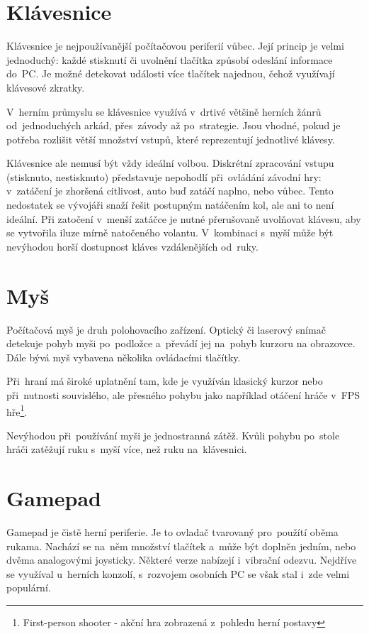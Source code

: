 \documentclass[thesis=B,czech,hidelinks]{FITthesis}[2012/06/26] %
\begin{document}
\section{Klávesnice}

Klávesnice je nejpoužívanější počítačovou periferií vůbec. Její princip je velmi jednoduchý: každé stisknutí či uvolnění tlačítka způsobí odeslání informace do~PC. Je možné detekovat události více tlačítek najednou, čehož využívají klávesové zkratky.

V~herním průmyslu se klávesnice využívá v~drtivé většině herních žánrů od~jednoduchých arkád, přes~závody až po~strategie. Jsou vhodné, pokud je potřeba rozlišit větší množství vstupů, které reprezentují jednotlivé klávesy.

Klávesnice ale nemusí být vždy ideální volbou. Diskrétní zpracování vstupu (stisknuto, nestisknuto) představuje nepohodlí při~ovládání závodní hry: v~zatáčení je zhoršená citlivost, auto buď zatáčí naplno, nebo vůbec. Tento nedostatek se vývojáři snaží řešit postupným natáčením kol, ale ani to není ideální. Při zatočení v~menší zatáčce je nutné přerušovaně uvolňovat klávesu, aby se vytvořila iluze mírně natočeného volantu. V~kombinaci s~myší může být nevýhodou horší dostupnost kláves vzdálenějších od~ruky.

\section{Myš}

Počítačová myš je druh polohovacího zařízení. Optický či laserový snímač detekuje pohyb myši po~podložce a~převádí jej na~pohyb kurzoru na obrazovce. Dále bývá myš vybavena několika ovládacími tlačítky.

Při~hraní má široké uplatnění tam, kde je využíván klasický kurzor nebo při~nutnosti souvislého, ale přesného pohybu jako například otáčení hráče v~FPS hře\footnote{First-person shooter - akční hra zobrazená z~pohledu herní postavy}.

Nevýhodou při~používání myši je jednostranná zátěž. Kvůli pohybu po~stole hráči zatěžují ruku s~myší více, než ruku na~klávesnici.

\section{Gamepad}

Gamepad je čistě herní periferie. Je to ovladač tvarovaný pro~použítí oběma rukama. Nachází se na~něm množství tlačítek a~může být doplněn jedním, nebo dvěma analogovými joysticky. Některé verze nabízejí i~vibrační odezvu. Nejdříve se využíval u~herních konzolí, s~rozvojem osobních PC se však stal i~zde velmi populární.
\end{document}
